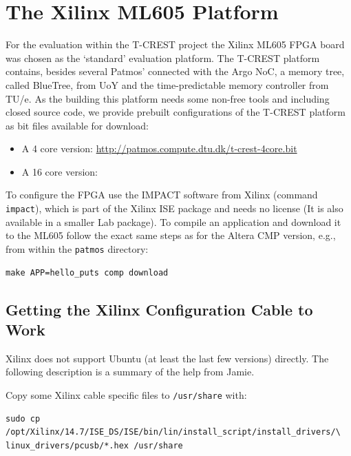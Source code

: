 \documentclass[a4paper,fontsize=10pt,twoside,DIV15,BCOR12mm,headinclude=true,footinclude=false,pagesize,bibtotoc]{scrbook}
\newcommand{\code}[1]{{\texttt{#1}}}
\begin{document}

\section{The Xilinx ML605 Platform}

For the evaluation within the T-CREST project the Xilinx ML605 FPGA board was chosen as the `standard'
evaluation platform. The T-CREST platform contains, besides several Patmos' connected with the Argo NoC,
a memory tree, called BlueTree, from UoY and the time-predictable memory controller from TU/e. As the
building this platform needs some non-free tools and including closed source code, we provide prebuilt
configurations of the T-CREST platform as bit files available for download:

\begin{itemize}
\item A 4 core version: \url{http://patmos.compute.dtu.dk/t-crest-4core.bit}
\item A 16 core version: 
\end{itemize}

To configure the FPGA use the IMPACT software from Xilinx (command \code{impact}), which is part of the Xilinx ISE package
and needs no license (It is also available in a smaller Lab package). To compile an application and
download it to the ML605 follow the exact same steps as for the Altera CMP version, e.g., from
within the \code{patmos} directory:

\begin{verbatim}
make APP=hello_puts comp download
\end{verbatim}

\subsection{Getting the Xilinx Configuration Cable to Work}

Xilinx does not support Ubuntu (at least the last few versions) directly. The following description
is a summary of the help from Jamie.

Copy some Xilinx cable specific files to \code{/usr/share} with:

\begin{verbatim}
sudo cp /opt/Xilinx/14.7/ISE_DS/ISE/bin/lin/install_script/install_drivers/\
linux_drivers/pcusb/*.hex /usr/share
\end{verbatim}
 
\end{document}
